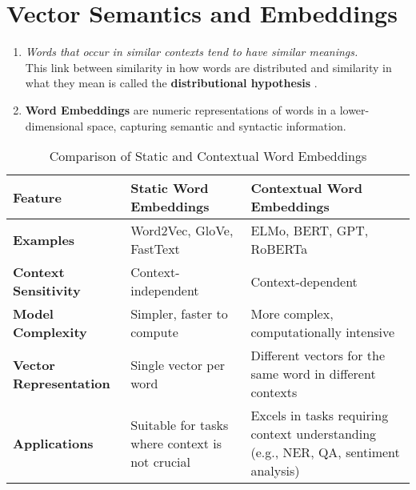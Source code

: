 \chapter{Vector Semantics and Embeddings \cite{nlp-1}}

\begin{enumerate}
    \item \textit{Words that occur in similar contexts tend to have similar meanings.}\\ This link between similarity in how words are distributed and similarity in what they mean is called the \textbf{distributional hypothesis} .

    \item \textbf{Word Embeddings} are numeric representations of words in a lower-dimensional space, capturing semantic and syntactic information. \cite{gfg-word-embeddings-in-nlp}
    
\end{enumerate}

\begin{table}[h!]
    \centering
    \begin{tabular}{|p{3cm}|p{5cm}|p{5cm}|}
        \hline
        \textbf{Feature} & \textbf{Static Word Embeddings} & \textbf{Contextual Word Embeddings} \\
        \hline
        \textbf{Examples} & Word2Vec, GloVe, FastText & ELMo, BERT, GPT, RoBERTa \\
        \hline
        \textbf{Context Sensitivity} & Context-independent & Context-dependent \\
        \hline
        \textbf{Model Complexity} & Simpler, faster to compute & More complex, computationally intensive \\
        \hline
        \textbf{Vector Representation} & Single vector per word & Different vectors for the same word in different contexts \\
        \hline
        \textbf{Applications} & Suitable for tasks where context is not crucial & Excels in tasks requiring context understanding (e.g., NER, QA, sentiment analysis) \\
        \hline
    \end{tabular}
    \caption{Comparison of Static and Contextual Word Embeddings \cite{chatgpt}}
\end{table}

